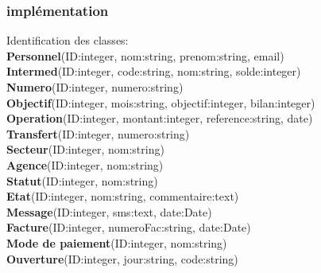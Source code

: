 		\subsubsection{implémentation}
		Identification des classes:\\
		
		\textbf{Personnel}(ID:integer, nom:string, prenom:string, email)\\
		
		\textbf{Intermed}(ID:integer, code:string, nom:string, solde:integer)\\
		
		\textbf{Numero}(ID:integer, numero:string)\\
		
		\textbf{Objectif}(ID:integer, mois:string, objectif:integer, bilan:integer)\\
		
		\textbf{Operation}(ID:integer, montant:integer, reference:string, date)\\
		
		\textbf{Transfert}(ID:integer, numero:string)\\
		
		\textbf{Secteur}(ID:integer, nom:string)\\
		
		\textbf{Agence}(ID:integer, nom:string)\\
		
		\textbf{Statut}(ID:integer, nom:string)\\
		
		\textbf{Etat}(ID:integer, nom:string, commentaire:text)\\
		
		\textbf{Message}(ID:integer, sms:text, date:Date)\\
		
		\textbf{Facture}(ID:integer, numeroFac:string, date:Date)\\
		
		\textbf{Mode de paiement}(ID:integer, nom:string)\\
		
		\textbf{Ouverture}(ID:integer, jour:string, code:string)\\
		
